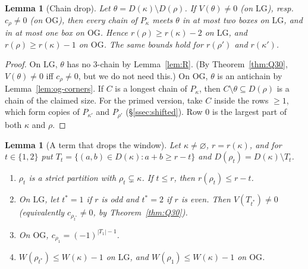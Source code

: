 \documentclass[11pt]{amsart}
\newtheorem{lemma}[theorem]{Lemma}
\theoremstyle{definition}
\theoremstyle{remark}
\newcommand{\LG}{\mathrm{LG}}
\newcommand{\OG}{\mathrm{OG}}
\begin{document}
\begin{lemma}[Chain drop]\label{lem:chaindrop}
Let $\theta=D(\kappa)\setminus D(\rho)$. If $V(\theta)\ne0$ (on $\LG$), resp.\ $c_\rho\ne0$ (on
$\OG$), then every chain of $P_\kappa$ meets $\theta$ in at most two boxes on $\LG$, and in at
most one box on $\OG$. Hence $r(\rho)\ge r(\kappa)-2$ on
$\LG$, and $r(\rho)\ge r(\kappa)-1$ on $\OG$. The same bounds hold for $r(\rho')$ and
$r(\kappa')$.
\end{lemma}

\begin{proof}
On $\LG$, $\theta$ has no $3$-chain by Lemma~\ref{lem:R}. (By Theorem~\ref{thm:Q30},
$V(\theta)\ne0$ iff $c_\rho\ne0$, but we do not need this.) On $\OG$,
$\theta$ is an antichain by Lemma~\ref{lem:og-corners}. If $C$ is a longest chain of
$P_\kappa$, then $C\setminus\theta\subseteq D(\rho)$ is a chain of the claimed size. For the
primed version, take $C$ inside the rows $\ge1$, which form copies of $P_{\kappa'}$ and
$P_{\rho'}$ (\S\ref{ssec:shifted}). Row $0$ is the largest part of both $\kappa$ and $\rho$.
\end{proof}

\begin{lemma}[A term that drops the window]\label{lem:A}
Let $\kappa\ne\varnothing$, $r=r(\kappa)$, and for $t\in\{1,2\}$ put
$T_t=\{(a,b)\in D(\kappa):a+b\ge r-t\}$ and $D(\rho_t)=D(\kappa)\setminus T_t$.
\begin{enumerate}[label=(\roman*)]
\item $\rho_t$ is a strict partition with $\rho_t\subsetneq\kappa$. If $t\le r$, then
$r(\rho_t)\le r-t$.
\item On $\LG$, let $t^*=1$ if $r$ is odd and $t^*=2$ if $r$ is even. Then $V(T_{t^*})\ne0$
(equivalently $c_{\rho_{t^*}}\ne0$, by Theorem~\ref{thm:Q30}).
\item On $\OG$, $c_{\rho_1}=(-1)^{|T_1|-1}$.
\item $W(\rho_{t^*})\le W(\kappa)-1$ on $\LG$, and $W(\rho_1)\le W(\kappa)-1$ on $\OG$.
\end{enumerate}
\end{lemma}
\end{document}

